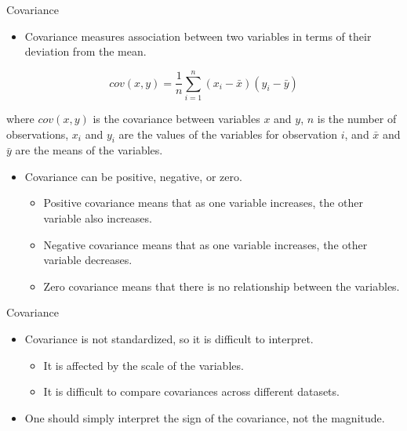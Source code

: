 \documentclass[
  10pt,
  ignorenonframetext,
]{beamer}
\providecommand{\tightlist}{%
  \setlength{\itemsep}{0pt}\setlength{\parskip}{0pt}}\usepackage{longtable,booktabs,array}
\begin{document}
\begin{frame}{Covariance}
\label{covariance}
\begin{itemize}
\tightlist
\item
  Covariance measures association between two variables in terms of
  their deviation from the mean.
\end{itemize}

\[ cov(x, y) = \frac{1}{n} \sum_{i=1}^{n} (x_i - \bar{x})(y_i - \bar{y}) \]

where \(cov(x, y)\) is the covariance between variables \(x\) and \(y\),
\(n\) is the number of observations, \(x_i\) and \(y_i\) are the values
of the variables for observation \(i\), and \(\bar{x}\) and \(\bar{y}\)
are the means of the variables.

\begin{itemize}
\tightlist
\item
  Covariance can be positive, negative, or zero.

  \begin{itemize}
  \tightlist
  \item
    Positive covariance means that as one variable increases, the other
    variable also increases.
  \item
    Negative covariance means that as one variable increases, the other
    variable decreases.
  \item
    Zero covariance means that there is no relationship between the
    variables.
  \end{itemize}
\end{itemize}
\end{frame}

\begin{frame}{Covariance}
\label{covariance-1}
\begin{itemize}
\tightlist
\item
  Covariance is not standardized, so it is difficult to interpret.

  \begin{itemize}
  \tightlist
  \item
    It is affected by the scale of the variables.
  \item
    It is difficult to compare covariances across different datasets.
  \end{itemize}
\item
  One should simply interpret the sign of the covariance, not the
  magnitude.
\end{itemize}
\end{frame}
\end{document}
